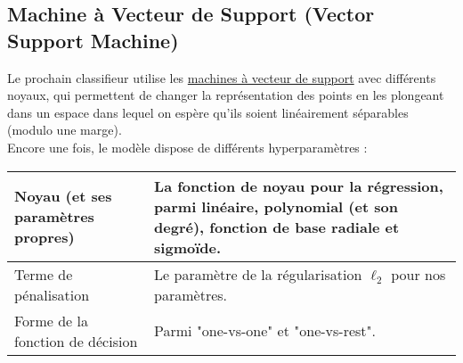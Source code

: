 \subsection{Machine à Vecteur de Support (Vector Support Machine)}

Le prochain classifieur utilise les \href{https://scikit-learn.org/stable/modules/generated/sklearn.svm.SVC.html}{machines à vecteur de support} avec différents noyaux, qui permettent de changer la représentation des points en les plongeant dans un espace dans lequel on espère qu'ils soient linéairement séparables (modulo une marge).\\

Encore une fois, le modèle dispose de différents hyperparamètres :

\noindent
\begin{tabularx}{\textwidth}{|X|X|}
    \hline
    Noyau (et ses paramètres propres)  & La fonction de noyau pour la régression, parmi linéaire, polynomial (et son degré), fonction de base radiale et sigmoïde.\\\hline
    Terme de pénalisation  & Le paramètre de la régularisation $\ell_2$ pour nos paramètres.\\\hline
    Forme de la fonction de décision  & Parmi "one-vs-one" et "one-vs-rest".\\\hline
\end{tabularx}